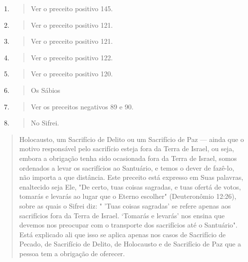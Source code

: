 \begin{enumerate}
\def\labelenumi{\arabic{enumi}.}
\setcounter{enumi}{108}
\item
 \begin{quote}
 Ver o preceito positivo 145.
 \end{quote}
\item
 \begin{quote}
 Ver o preceito positivo 121.
 \end{quote}
\item
 \begin{quote}
 Ver o preceito positivo 121.
 \end{quote}
\item
 \begin{quote}
 Ver o preceito positivo 122.
 \end{quote}
\item
 \begin{quote}
 Ver o preceito positivo 120.
 \end{quote}
\item
 \begin{quote}
 Os Sábios
 \end{quote}
\item
 \begin{quote}
 Ver os preceitos negativos 89 e 90.
 \end{quote}
\item
 \begin{quote}
 No Sifrei.
 \end{quote}
\end{enumerate}

\begin{quote}Holocausto, um Sacrifício de Delito ou um Sacrifício de Paz --- ainda
que o mo­tivo responsável pelo sacrifício esteja fora da Terra de
Israel, ou seja, embora a obrigação tenha sido ocasionada fora da Terra
de Israel, somos ordenados a levar os sacrifícios ao Santuário, e temos
o dever de fazê-lo, não importa a que distância. Este preceito está
expresso em Suas palavras, enaltecido seja Ele, "De certo, tuas coisas
sagradas, e tuas ofertá de votos, tomarás e levarás ao lugar que o
Eterno escolher" (Deuteronômio 12:26), sobre as quais o Sifrei diz: "
'Tuas coisas sagradas' se refere apenas aos sacrifícios fora da Terra de
Israel. `Tomarás e levarás' nos ensina que devemos nos preocupar com o
transporte dos sacrifícios até o Santuário". Está explicado ali que isso
se aplica apenas nos casos de Sacrifício de Pecado, de Sacrifício de
Delito, de Holocausto e de Sacri­fício de Paz que a pessoa tem a
obrigação de oferecer.
\end{quote}

